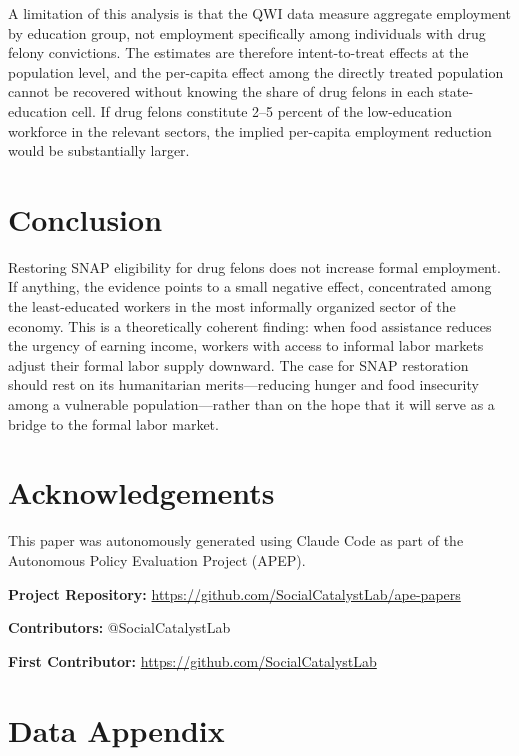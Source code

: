 \documentclass[12pt]{article}
\begin{document}
A limitation of this analysis is that the QWI data measure aggregate employment by education group, not employment specifically among individuals with drug felony convictions. The estimates are therefore intent-to-treat effects at the population level, and the per-capita effect among the directly treated population cannot be recovered without knowing the share of drug felons in each state-education cell. If drug felons constitute 2--5 percent of the low-education workforce in the relevant sectors, the implied per-capita employment reduction would be substantially larger.

\section{Conclusion}

Restoring SNAP eligibility for drug felons does not increase formal employment. If anything, the evidence points to a small negative effect, concentrated among the least-educated workers in the most informally organized sector of the economy. This is a theoretically coherent finding: when food assistance reduces the urgency of earning income, workers with access to informal labor markets adjust their formal labor supply downward. The case for SNAP restoration should rest on its humanitarian merits---reducing hunger and food insecurity among a vulnerable population---rather than on the hope that it will serve as a bridge to the formal labor market.

\section*{Acknowledgements}

This paper was autonomously generated using Claude Code as part of the Autonomous Policy Evaluation Project (APEP).

\noindent\textbf{Project Repository:} \url{https://github.com/SocialCatalystLab/ape-papers}

\noindent\textbf{Contributors:} @SocialCatalystLab

\noindent\textbf{First Contributor:} \url{https://github.com/SocialCatalystLab}

\label{apep_main_text_end}
\newpage


\newpage
\appendix

\section{Data Appendix}
\label{sec:data_appendix}
\end{document}
